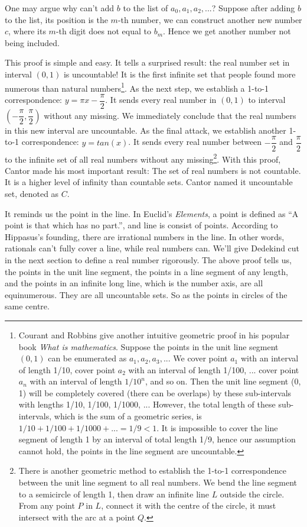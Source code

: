\documentclass{article}
\begin{document}
One may argue why can't add $b$ to the list of $a_0, a_1, a_2, ...$? Suppose after adding $b$ to the list, its position is the $m$-th number, we can construct another new number $c$, where its $m$-th digit does not equal to $b_m$. Hence we get another number not being included.

This proof is simple and easy. It tells a surprised result: the real number set in interval $(0, 1)$ is uncountable! It is the first infinite set that people found more numerous than natural numbers\footnote{Courant and Robbins give another intuitive geometric proof in his popular book {\em What is mathematics}. Suppose the points in the unit line segment $(0, 1)$ can be enumerated as $a_1, a_2, a_3, ...$ We cover point $a_1$ with an interval of length 1/10, cover point $a_2$ with an interval of length 1/100, ... cover point $a_n$ with an interval of length $1/10^n$, and so on. Then the unit line segment (0, 1) will be completely covered (there can be overlaps) by these sub-intervals with lengths 1/10, 1/100, 1/1000, ... However, the total length of these sub-intervals, which is the sum of a geometric series, is $1/10 + 1/100 + 1/1000 + ... = 1/9 < 1$. It is impossible to cover the line segment of length 1 by an interval of total length 1/9, hence our assumption cannot hold, the points in the line segment are uncountable\cite{Courant1969}.}. As the next step, we establish a 1-to-1 correspondence: $y = \pi x - \dfrac{\pi}{2}$. It sends every real number in $(0, 1)$ to interval $(-\dfrac{\pi}{2}, \dfrac{\pi}{2})$ without any missing. We immediately conclude that the real numbers in this new interval are uncountable. As the final attack, we establish another 1-to-1 correspondence: $ y = tan(x)$. It sends every real number between $-\dfrac{\pi}{2}$ and $\dfrac{\pi}{2}$ to the infinite set of all real numbers without any missing\footnote{There is another geometric method to establish the 1-to-1 correspondence between the unit line segment to all real numbers. We bend the line segment to a semicircle of length 1, then draw an infinite line $L$ outside the circle. From any point $P$ in $L$, connect it with the centre of the circle, it must intersect with the arc at a point $Q$.}. With this proof, Cantor made his most important result: The set of real numbers is not countable. It is a higher level of infinity than countable sets. Cantor named it uncountable set, denoted as $C$.

It reminds us the point in the line. In Euclid's {\em Elements}, a point is defined as ``A point is that which has no part.'', and line is consist of points. According to Hippasus's founding, there are irrational numbers in the line. In other words, rationals can't fully cover a line, while real numbers can. We'll give Dedekind cut in the next section to define a real number rigorously. The above proof tells us, the points in the unit line segment, the points in a line segment of any length, and the points in an infinite long line, which is the number axis, are all equinumerous. They are all uncountable sets. So as the points in circles of the same centre.
\end{document}
